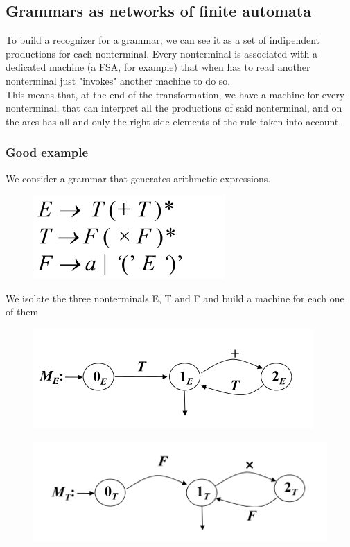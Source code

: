 \documentclass[10pt,a4paper]{article}
\begin{document}
			\subsection{Grammars as networks of finite automata}
				To build a recognizer for a grammar, we can see it as a set of indipendent productions for each nonterminal. Every nonterminal is associated with a dedicated machine (a FSA, for example) that when has to read another nonterminal just "invokes" another machine to do so.\\
				This means that, at the end of the transformation, we have a machine for every nonterminal, that can interpret all the productions of said nonterminal, and on the arcs has all and only the right-side elements of the rule taken into account.\\
				
				\subsubsection{Good example}
					We consider a grammar that generates arithmetic expressions.
					\begin{figure}[htp]
						\begin{center}
							\includegraphics[]{./images/exGrammar.png}
						\end{center}
					\end{figure}
					We isolate the three nonterminals E, T and F and build a machine for each one of them
					\begin{figure}[htp]
						\begin{center}
							\includegraphics[]{./images/exE.png}
						\end{center}
					\end{figure}
					\begin{figure}[htp]
						\begin{center}
							\includegraphics[]{./images/exT.png}
						\end{center}
					\end{figure}
\end{document}

